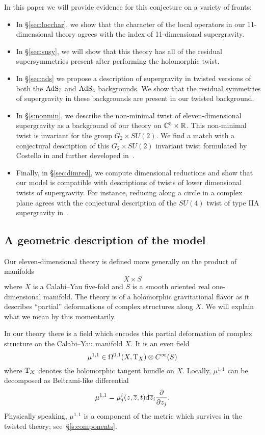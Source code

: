 In this paper we will provide evidence for this conjecture on a variety of fronts:
\begin{itemize}[leftmargin=\parindent,itemsep=\parskip]
\item 
In \S\ref{sec:locchar}, we show that the character of the local operators in our 11-dimensional theory agrees with the index of 11-dimensional supergravity. 
\item
In \S\ref{sec:susy}, we will show that this theory has all of the residual supersymmetries present after performing the holomorphic twist.
\item
In \S\ref{sec:ads} we propose a description of supergravity in twisted versions of both the ${\rm AdS}_7$ and ${\rm AdS}_4$ backgrounds. 
We show that the residual symmetries of supergravity in these backgrounds are present in our twisted background.
\item
In \S\ref{s:nonmin}, we describe the non-minimal twist of eleven-dimensional supergravity as a background of our theory on $\mathbb C^5 \times \mathbb R$. 
This non-minimal twist is invariant for the group $G_2 \times SU(2)$. 
We find a match with a conjectural description of this $G_2 \times SU(2)$ invariant twist formulated by Costello in \cite{CostelloM5} and further developed in~\cite{RY}.  
\item Finally, in \S\ref{sec:dimred}, we compute dimensional reductions and show that our model is compatible with descriptions of twists of lower dimensional twists of supergravity. 
For instance, reducing along a circle in a complex plane agrees with the conjectural description of the $SU(4)$ twist of type IIA supergravity in~\cite{CLsugra}.
\end{itemize}

\subsection*{A geometric description of the model} 

Our eleven-dimensional theory is defined more generally on the product of manifolds 
\[
X \times S
\]
where $X$ is a Calabi--Yau five-fold and $S$ is a smooth oriented real one-dimensional manifold. 
The theory is of a holomorphic gravitational flavor as it describes ``partial'' deformations of complex structures along $X$. 
We will explain what we mean by this momentarily. 

In our theory there is a field which encodes this partial deformation of complex structure on the Calabi--Yau manifold $X$.
It is an even field 
\[
\mu^{1,1} \in \Omega^{0,1} (X , {\rm T}_X) \otimes C^\infty(S) 
\]
where ${\rm T}_X$ denotes the holomorphic tangent bundle on $X$.
Locally, $\mu^{1,1}$ can be decomposed as Beltrami-like differential
\[
\mu^{1,1} = \mu^i_j (z,\overline{z}, t) {\rm d} \overline{z}_i \frac{\partial}{\partial z_j} .
\]
Physically speaking, $\mu^{1,1}$ is a component of the metric which survives in the twisted theory; see~\S\ref{s:components}. 

